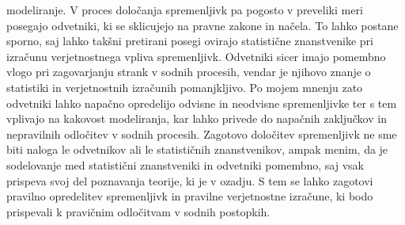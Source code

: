 \documentclass[fin1, tisk]{fmfdelo}
\theoremstyle{definition} %
\theoremstyle{trditev} %
\theoremstyle{izrek}
\begin{document}
modeliranje. V proces določanja spremenljivk pa pogosto v preveliki meri posegajo odvetniki, ki se sklicujejo na pravne zakone in načela. To lahko
postane sporno, saj lahko takšni pretirani posegi ovirajo statistične znanstvenike pri izračunu verjetnostnega vpliva spremenljivk. Odvetniki sicer
imajo pomembno vlogo pri zagovarjanju strank v sodnih procesih, vendar je njihovo znanje o statistiki in verjetnostnih izračunih pomanjkljivo. Po
mojem mnenju zato odvetniki lahko napačno opredelijo odvisne in neodvisne spremenljivke ter s tem vplivajo na kakovost modeliranja, kar lahko privede
do napačnih zaključkov in nepravilnih odločitev v sodnih procesih. Zagotovo določitev spremenljivk ne sme biti naloga le odvetnikov ali le statističnih
znanstvenikov, ampak menim, da je sodelovanje med statistični znanstveniki in odvetniki pomembno, saj vsak prispeva svoj del poznavanja teorije,
ki je v ozadju.  S tem se lahko zagotovi pravilno opredelitev spremenljivk in pravilne verjetnostne izračune, ki bodo prispevali k pravičnim
odločitvam v sodnih postopkih.

\end{document}
